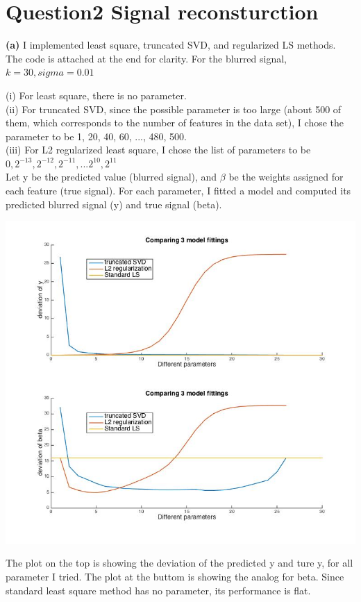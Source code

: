 \documentclass[paper=a4, fontsize=11pt]{scrartcl} %
\numberwithin{equation}{section} %
\numberwithin{figure}{section} %
\numberwithin{table}{section} %
\begin{document}
\newpage

\section*{Question2 Signal reconsturction}

\textbf{(a)} I implemented least square, truncated SVD, and regularized LS methods. The code is attached at the end for clarity. For the blurred signal, $k = 30, sigma = 0.01$

(i) For least square, there is no parameter. \\
(ii) For truncated SVD, since the possible parameter is too large (about 500 of them, which corresponds to the number of features in the data set), I chose the parameter to be 1, 20, 40, 60, ..., 480, 500. \\
(iii) For L2 regularized least square, I chose the list of parameters to be $0, 2^{-13}, 2^{-12}, 2^{-11}, ... 2^{10}, 2^{11}$\\ 

Let y be the predicted value (blurred signal), and $\beta$ be the weights assigned for each feature (true signal). For each parameter, I fitted a model and computed its predicted blurred signal (y) and true signal (beta). 
\begin{center}
\includegraphics[scale=.5]{2a_compare3models.jpg}
\end{center}
The plot on the top is showing the deviation of the predicted y and ture y, for all parameter I tried. The plot at the buttom is showing the analog for beta. Since standard least square method has no parameter, its performance is flat. 
\end{document}
